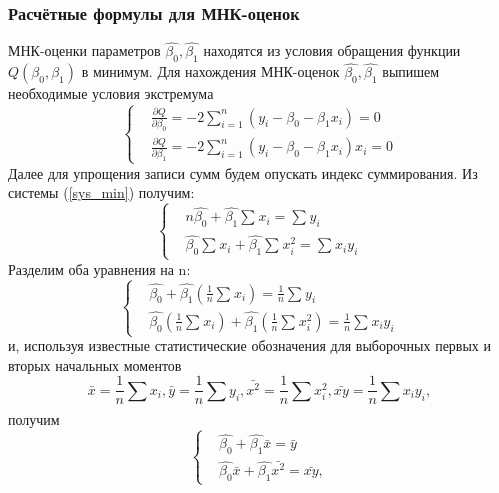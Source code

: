 \documentclass[a4paper]{article}
\begin{document}
	\subsubsection{Расчётные формулы для МНК-оценок}
	\noindent МНК-оценки параметров $\hat{\beta_0}, \hat{\beta_1}$ находятся из условия обращения функции $Q(\beta_0, \beta_1)$ в минимум. 
	\newline
	Для нахождения МНК-оценок $\hat{\beta_0}, \hat{\beta_1}$ выпишем необходимые условия экстремума
	\begin{equation}
	   \begin{cases}
         & \frac{\partial Q}{\partial \beta_{0}}  = 
         -2\sum_{i=1}^{n}{(y_{i} - \beta_{0} - \beta_{1}x_{i})} = 0\\ 
         & \frac{\partial Q}{\partial \beta_{1}}  = 
         -2\sum_{i=1}^{n}{(y_{i} - \beta_{0} - \beta_{1}x_{i})x_{i}} = 0 
       \end{cases}
       \label{sys_min}
	\end{equation}
	Далее для упрощения записи сумм будем опускать индекс суммирования. Из системы (\ref{sys_min}) получим:
	$$
	   \begin{cases}
         & n\hat{\beta_{0}} + \hat{\beta_{1}}\sum_{}{}{x_{i}} = 
         \sum_{}{}{y_{i}}\\ 
        & \hat{\beta_{0}}\sum_{}{}{x_{i}} + \hat{\beta_{1}}\sum_{}{}{x_{i}^{2}} = \sum_{}{}{x_{i}y_{i}}
       \end{cases}
       \label{sys_2}
	$$
	Разделим оба уравнения на n:
	$$
	   \begin{cases}
         & \hat{\beta_{0}} + \hat{\beta_{1}}(\frac{1}{n}\sum_{}{}{x_{i}}) = 
         \frac{1}{n}\sum_{}{}{y_{i}}\\ 
        & \hat{\beta_{0}}(\frac{1}{n}\sum_{}{}{x_{i}}) + \hat{\beta_{1}}(\frac{1}{n}\sum_{}{}{x_{i}^{2}}) = \frac{1}{n}\sum_{}{}{x_{i}y_{i}}
       \end{cases}
       \label{sys_3}
	$$
	и, используя известные статистические обозначения для выборочных первых и вторых начальных моментов
	$$
	    \bar{x} = \frac{1}{n}\sum_{}{}{x_{i}}, \bar{y} = \frac{1}{n}\sum_{}{}{y_{i}}, \bar{x^{2}} = \frac{1}{n}\sum_{}{}{x_{i}^{2}}, \bar{xy} = \frac{1}{n}\sum_{}{}{x_{i}y_{i}}, 
	$$
	получим
		\begin{equation}
	   \begin{cases}
         & \hat{\beta_{0}} + \hat{\beta_{1}}\bar{x} = 
         \bar{y}\\ 
        & \hat{\beta_{0}}\bar{x} + \hat{\beta_{1}}\bar{x^{2}} = \bar{xy},
       \end{cases}
       \label{sys_fin}
	\end{equation}
\end{document}
